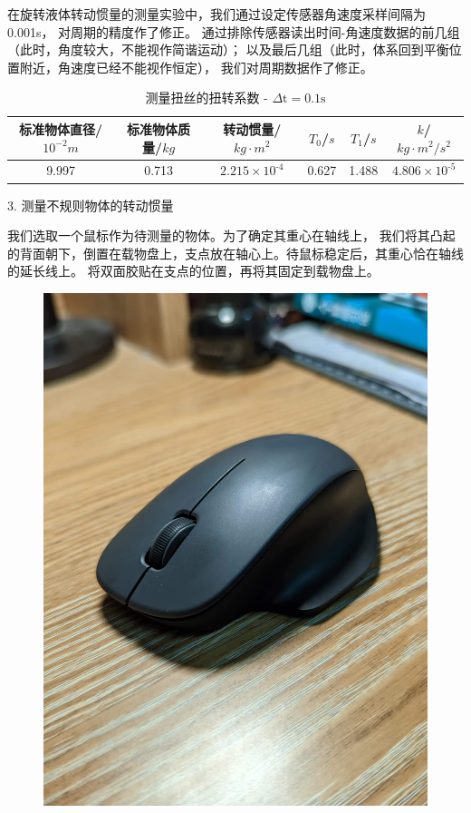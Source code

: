 \documentclass[12pt,hyperref,a4paper,UTF8]{ctexart}
\begin{document}
在旋转液体转动惯量的测量实验中，我们通过设定传感器角速度采样间隔为0.001s，
对周期的精度作了修正。
通过排除传感器读出时间-角速度数据的前几组（此时，角度较大，不能视作简谐运动）；
以及最后几组（此时，体系回到平衡位置附近，角速度已经不能视作恒定），
我们对周期数据作了修正。

\begin{table}[h!]
\centering
\begin{tabular}{|c|c|c|c|c|c|}
    \hline
        标准物体直径/$ 10^{-2} m $ & 标准物体质量/$kg$ & 转动惯量/$kg·m^2$ & $T_0$/$s$ & $T_1$/$s$ & $k$/$kg·m^2/s^2$\\
    \hline
        9.997 & 0.713 & $\text{2.215} \times \text{10}^{\text{-4}}$ & 0.627 & 1.488 & $\text{4.806} \times \text{10}^{\text{-5}}$ \\
    \hline
\end{tabular}
\caption{测量扭丝的扭转系数 - $ \Delta \text{t} = \text{0.1s} $}
\end{table}

3. 测量不规则物体的转动惯量

我们选取一个鼠标作为待测量的物体。为了确定其重心在轴线上，
我们将其凸起的背面朝下，倒置在载物盘上，支点放在轴心上。待鼠标稳定后，其重心恰在轴线的延长线上。
将双面胶贴在支点的位置，再将其固定到载物盘上。

\begin{figure}[htbp]
    \centering
    \includegraphics{mouse.eps}
    \caption{}
\end{figure}
\end{document}
